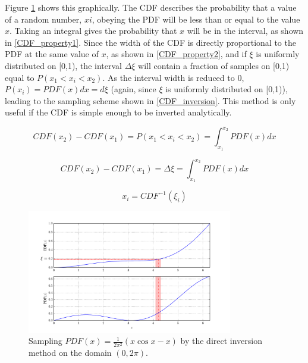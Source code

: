 Figure \ref{direct_samp} shows this graphically.  The CDF describes the probability that a value of a random number, $xi$, obeying the PDF will be less than or equal to the value $x$.  Taking an integral gives the probability that $x$ will be in the interval, as shown in \eqref{CDF_property1}.  Since the width of the CDF is directly proportional to the PDF at the same value of $x$, as shown in \eqref{CDF_property2}, and if $\xi$ is uniformly distributed on [0,1), the interval $\Delta \xi$ will contain a fraction of samples on [0,1) equal to $P( x_1 < x_i < x_2)$.  As the interval width is reduced to 0, $P(x_i)= PDF(x)dx = d\xi$ (again, since $\xi$ is uniformly distributed on [0,1)), leading to the sampling scheme shown in \eqref{CDF_inversion}.  This method is only useful if the CDF is simple enough to be inverted analytically.

\begin{equation}
\label{CDF_property1}
CDF(x_2) - CDF(x_1) = P( x_1 < x_i < x_2) = \int_{x_1}^{x_2} PDF(x) dx
\end{equation}

\begin{equation}
\label{CDF_property2}
CDF(x_2) - CDF(x_1) = \Delta \xi =  \int_{x_1}^{x_2} PDF(x) dx
\end{equation}

\begin{equation}
\label{CDF_inversion}
 x_i = CDF^{-1}(\xi_i)
\end{equation}

\begin{figure}[h!] 
  \centering
    \includegraphics[width=0.8\textwidth]{graphics/direct_samp.pdf}
     \caption{Sampling $PDF(x)=\frac{1}{2\pi^2}(x \cos x - x)$ by the direct inversion method on the domain $(0,2\pi)$. \label{direct_samp}}
\end{figure}

